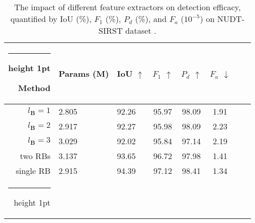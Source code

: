 \documentclass[10pt,journal,compsoc]{IEEEtran}
\makeatletter
\newcommand{\thickhline}{%

    \noalign {\ifnum 0=`}\fi \hrule height 1pt
    \futurelet \reserved@a \@xhline
}
\makeatother
\begin{document}


\begin{table}[t]
\caption{The impact of different feature extractors on detection efficacy, quantified by IoU (\%), $F_1$ (\%), $P_d$ (\%), and $F_a$ ($10^{-5}$) on NUDT-SIRST dataset \cite{li-2023-dnanet}.}
\footnotesize
\renewcommand\arraystretch{1.1}
\centering
\begin{tabular}{rIIccccc}
\hline\thickhline
{}\textbf{Method} &\textbf{Params (M)}& IoU $\uparrow$ & $F_1$ $\uparrow$ & $P_d$ $\uparrow$ & $F_a$  $\downarrow$ \\ \hline\hline
 $l_\mathbf{B}=1$   & 2.805 &  92.26&  95.97  & 98.09 & 1.91  \\ 
$l_\mathbf{B}=2$    & 2.917 &  92.27    &  95.98 & 98.09  &  2.23  \\ 
$l_\mathbf{B}=3$     &  3.029&  92.02   &  95.84 &  97.14 & 2.19  \\
 two RBs    &  3.137 &   93.65 & 96.72 &  97.98  & 1.41 \\ 
single RB   &  2.915   &  94.39   &  97.12 & 98.41    &  1.34    \\ 
\hline\thickhline
\end{tabular}
\label{tab:fe}
\vspace{-0.25cm}
\end{table}
\end{document}

